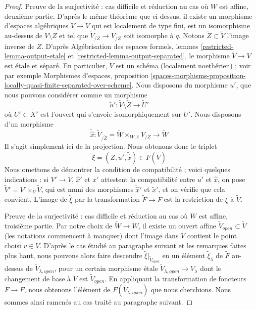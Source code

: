\begin{proof}
\medskip\noindent
Preuve de la surjectivité : cas difficile et réduction au cas où $W$ est
affine, deuxième partie. D'après le même théorème que ci-dessus, il existe un
morphisme d'espaces algébriques $\tilde V \to V$ qui est localement de type
fini, est un isomorphisme au-dessus de $V \setminus Z$ et tel que
$\tilde V_{/Z} \to V_{/Z}$ soit isomorphe à $q$.
Notons $\tilde Z \subset \tilde V$ l'image inverse de $Z$.
D'après Algébrisation des espaces formels, lemmes
\ref{restricted-lemma-output-etale} et \ref{restricted-lemma-output-separated},
le morphisme $\tilde V \to V$ est \'etale et séparé.
En particulier, $\tilde V$ est un schéma (localement noethérien) ; voir par
exemple Morphismes d'espaces, proposition
\ref{spaces-morphisms-proposition-locally-quasi-finite-separated-over-scheme}.
Nous disposons du morphisme $u'$, que nous pouvons considérer comme un morphisme
$$
\tilde u' : \tilde V \setminus \tilde Z \longrightarrow \tilde U'
$$
où $\tilde U' \subset \tilde X'$ est l'ouvert qui s'envoie isomorphiquement
sur $U'$. Nous disposons d'un morphisme
$$
\tilde {\hat x} :
\tilde V_{/\tilde Z} = \tilde W \times_{W, \hat x} V_{/Z}
\longrightarrow
\tilde W
$$
Il s'agit simplement ici de la projection. Nous obtenons donc le triplet
$$
\tilde \xi = (\tilde Z, \tilde u', \tilde {\hat x}) \in \tilde F(\tilde V)
$$
Nous omettons de démontrer la condition de compatibilité ; voici quelques
indications : si $V' \to V$, $\hat x'$ et $x'$ attestent la compatibilité entre
$u'$ et $\hat x$, on pose $\tilde V' = V' \times_V \tilde V$, qui est muni des
morphismes $\tilde{\hat x}'$ et $\tilde x'$, et on vérifie que cela convient.
L'image de $\tilde \xi$ par la transformation $\tilde F \to F$
est la restriction de $\xi$ à $\tilde V$.

\medskip\noindent
Preuve de la surjectivité : cas difficile et réduction au cas où $W$ est
affine, troisième partie. Par notre choix de $\tilde W \to W$, il existe un
ouvert affine $\tilde V_{open} \subset \tilde V$ (les notations commencent à
manquer) dont l'image dans $V$ contient le point choisi $v \in V$.
D'après le cas étudié au paragraphe suivant et les remarques faites plus haut,
nous pouvons alors faire descendre $\tilde \xi|_{\tilde V_{open}}$
en un élément $\tilde \xi_\lambda$ de $\tilde F$ au-dessus de
$\tilde V_{\lambda, open}$, pour un certain morphisme \'etale
$\tilde V_{\lambda, open} \to V_\lambda$
dont le changement de base à $V$ est $\tilde V_{open}$.
En appliquant la transformation de foncteurs $\tilde F \to F$, nous obtenons
l'élément de $F(\tilde V_{\lambda, open})$ que nous cherchions.
Nous sommes ainsi ramenés au cas traité au paragraphe suivant.


\end{proof}
